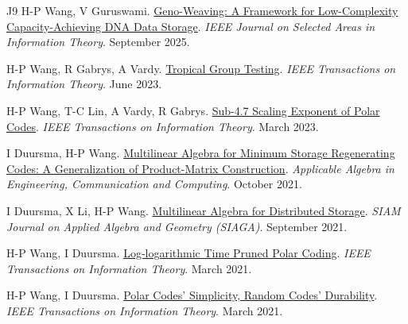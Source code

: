 \documentclass{article}
\def\sec#1{\vskip1em\textbf{\fs1#1}}
\def\fs#1{%
        \pgfmathsetmacro\a{#1}%
        \pgfmathsetmacro\A{\parskip*(4/3)^\a}%
        \pgfmathsetmacro\B{\A*(4/3)}%
        \fontsize{\A pt}{\B pt}\selectfont%
    }
\begin{document}
\bgroup
\def\section#1#2{\sec{Journal Publications \mdseries (new to old)}}
\begin{thebibliography}{J9}
    H-P Wang, V Guruswami.
    \href{https://doi.org/10.1109/JSAIT.2025.3610643}
    {Geno-Weaving: A Framework for Low-Complexity Capacity-Achieving DNA Data Storage}.
    \emph{IEEE Journal on Selected Areas in Information Theory}.
   September 2025.

    H-P Wang, R Gabrys, A Vardy.
    \href{https://doi.org/10.1109/TIT.2023.3282847}
    {Tropical Group Testing}.
    \emph{IEEE Transactions on Information Theory}.
    June 2023.

    H-P Wang, T-C Lin, A Vardy, R Gabrys.
    \href{https://doi.org/10.1109/TIT.2023.3253074}
    {Sub-4.7 Scaling Exponent of Polar Codes}.
    \emph{IEEE Transactions on Information Theory}.
    March 2023.

    I Duursma, H-P Wang.
    \href{https://doi.org/10.1007/s00200-021-00526-3}
    {Multilinear Algebra for Minimum Storage Regenerating Codes: A Generalization of Product-Matrix Construction}.
    \emph{Applicable Algebra in Engineering, Communication and Computing}.
    October 2021.

    I Duursma, X Li, H-P Wang.
    \href{https://doi.org/10.1137/20M1346742}
    {Multilinear Algebra for Distributed Storage}.
    \emph{SIAM Journal on Applied Algebra and Geometry (SIAGA)}.
    September 2021.

    H-P Wang, I Duursma.
    \href{https://doi.org/10.1109/TIT.2020.3041523}
    {Log-logarithmic Time Pruned Polar Coding}.
    \emph{IEEE Transactions on Information Theory}.
    March 2021.

    H-P Wang, I Duursma.
    \href{https://doi.org/10.1109/TIT.2020.3041570}
    {Polar Codes' Simplicity, Random Codes' Durability}.
    \emph{IEEE Transactions on Information Theory}.
    March 2021.
\end{thebibliography}
\egroup
\end{document}
